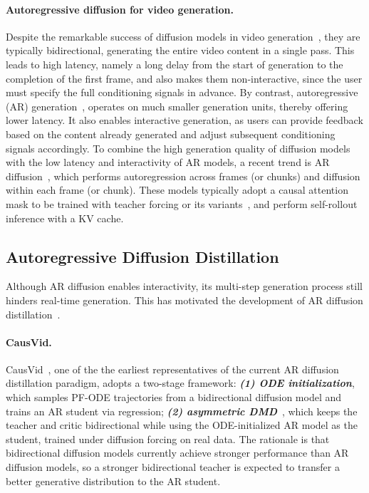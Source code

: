 \documentclass{llmxive}
\begin{document}
\paragraph{Autoregressive diffusion for video generation.}
Despite the remarkable success of diffusion models in video generation~\cite{videoworldsimulators2024,lin2024open,zheng2024open,yang2024cogvideox,wan2025wan,kong2024hunyuanvideo,bao2024vidu,li2025radial}, they are typically bidirectional, generating the entire video content in a single pass. This leads to high latency, namely a long delay from the start of generation to the completion of the first frame, and also makes them non-interactive, since the user must specify the full conditioning signals in advance. By contrast, autoregressive (AR) generation~\cite{wu2021godiva,hong2022cogvideo,wu2022nuwa,weissenborn2019scaling,yan2021videogpt,zhao2025ultraimage,zhao2025riflex,deng2024autoregressive,kondratyuk2023videopoet}, operates on much smaller generation units, thereby offering lower latency. It also enables interactive generation, as users can provide feedback based on the content already generated and adjust subsequent conditioning signals accordingly. To combine the high generation quality of diffusion models with the low latency and interactivity of AR models, a recent trend is AR diffusion~\cite{jin2024pyramidal,teng2025magi,chen2025skyreels}, which performs autoregression across frames (or chunks) and diffusion within each frame (or chunk). These models typically adopt a causal attention mask to be trained with teacher forcing or its variants~\cite{teng2025magi, chen2024diffusion, wu2025pack, guo2025end, po2025bagger}, and perform self-rollout inference with a KV cache.


\subsection{Autoregressive Diffusion Distillation}
\label{sec:bg-distillation}
Although AR diffusion enables interactivity, its multi-step generation process still hinders real-time generation. This has motivated the development of AR diffusion distillation~\cite{lin2025autoregressive,lin2025diffusion,yang2025towards,lu2025reward,wang2026worldcompass,yang2025longlive,liu2025rolling,cui2025self,sun2025worldplay}.

\paragraph{CausVid.}
CausVid~\cite{yin2025slow}, one of the the earliest representatives of the current AR diffusion distillation paradigm, adopts a two-stage framework:
\emph{\textbf{(1) ODE initialization}}, which samples PF-ODE trajectories from a bidirectional diffusion model and trains an AR student via regression;
\emph{\textbf{(2) asymmetric DMD}}~\cite{wang2023prolificdreamer,luo2023diff,yin2024one}, which keeps the teacher and critic bidirectional while using the ODE-initialized AR model as the student, trained under diffusion forcing on real data.
The rationale is that bidirectional diffusion models currently achieve stronger performance than AR diffusion models, so a stronger bidirectional teacher is expected to transfer a better generative distribution to the AR student.
\end{document}
